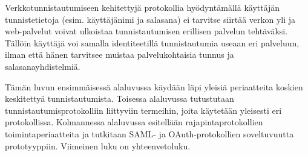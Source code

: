 Verkkotunnistautumiseen kehitettyjä protokollia hyödyntämällä käyttäjän tunnistetietoja (esim. käyttäjänimi ja salasana) ei tarvitse siirtää verkon yli ja web-palvelut voivat ulkoistaa tunnistautumisen erillisen palvelun tehtäväksi. Tällöin käyttäjä voi samalla identiteetillä tunnistautumia useaan eri palveluun, ilman että hänen tarvitsee muistaa palvelukohtaisia tunnus ja salasanayhdistelmiä.

Tämän luvun ensimmäisessä alaluvussa käydään läpi yleisiä periaatteita koskien keskitettyä tunnistautumista. Toisessa alaluvussa tutustutaan tunnistautumisprotokolliin liittyviin termeihin, joita käytetään yleisesti eri protokollissa. Kolmannessa alaluvussa esitellään rajapintaprotokollien toimintaperiaatteita ja tutkitaan SAML- ja OAuth-protokollien soveltuvuutta prototyyppiin. Viimeinen luku on yhteenvetoluku.